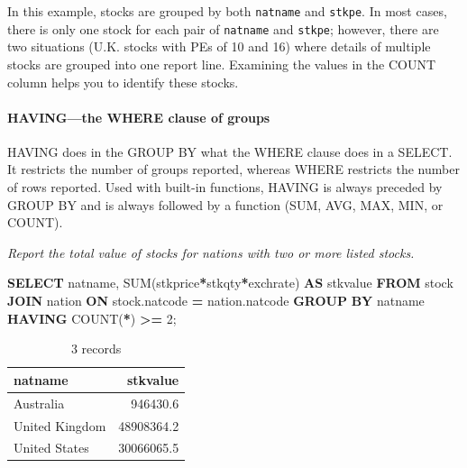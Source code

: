 \documentclass[
]{article}
\newenvironment{Shaded}{\begin{snugshade}}{\end{snugshade}}
\newcommand{\DecValTok}[1]{\textcolor[rgb]{0.00,0.00,0.81}{#1}}
\newcommand{\FunctionTok}[1]{\textcolor[rgb]{0.00,0.00,0.00}{#1}}
\newcommand{\KeywordTok}[1]{\textcolor[rgb]{0.13,0.29,0.53}{\textbf{#1}}}
\newcommand{\NormalTok}[1]{#1}
\newcommand{\OperatorTok}[1]{\textcolor[rgb]{0.81,0.36,0.00}{\textbf{#1}}}
\begin{document}
In this example, stocks are grouped by both \texttt{natname} and \texttt{stkpe}. In
most cases, there is only one stock for each pair of \texttt{natname} and
\texttt{stkpe}; however, there are two situations (U.K. stocks with PEs of 10
and 16) where details of multiple stocks are grouped into one report
line. Examining the values in the COUNT column helps you to identify
these stocks.

\hypertarget{havingthe-where-clause-of-groups}{%
\paragraph*{HAVING---the WHERE clause of groups}\label{havingthe-where-clause-of-groups}}

HAVING does in the GROUP BY what the WHERE clause does in a SELECT. It
restricts the number of groups reported, whereas WHERE restricts the
number of rows reported. Used with built-in functions, HAVING is always
preceded by GROUP BY and is always followed by a function (SUM, AVG,
MAX, MIN, or COUNT).

\emph{Report the total value of stocks for nations with two or more listed
stocks.}

\begin{Shaded}
\begin{Highlighting}[]
\KeywordTok{SELECT}\NormalTok{ natname, }\FunctionTok{SUM}\NormalTok{(stkprice}\OperatorTok{*}\NormalTok{stkqty}\OperatorTok{*}\NormalTok{exchrate) }\KeywordTok{AS}\NormalTok{ stkvalue}
    \KeywordTok{FROM}\NormalTok{ stock }\KeywordTok{JOIN}\NormalTok{ nation }\KeywordTok{ON}\NormalTok{ stock.natcode }\OperatorTok{=}\NormalTok{ nation.natcode}
        \KeywordTok{GROUP} \KeywordTok{BY}\NormalTok{ natname}
            \KeywordTok{HAVING} \FunctionTok{COUNT}\NormalTok{(}\OperatorTok{*}\NormalTok{) }\OperatorTok{\textgreater{}=} \DecValTok{2}\NormalTok{;}
\end{Highlighting}
\end{Shaded}

\begin{table}

\caption{\label{tab:unnamed-chunk-46}3 records}
\centering
\begin{tabular}[t]{l|r}
\hline
natname & stkvalue\\
\hline
Australia & 946430.6\\
\hline
United Kingdom & 48908364.2\\
\hline
United States & 30066065.5\\
\hline
\end{tabular}
\end{table}
\end{document}
